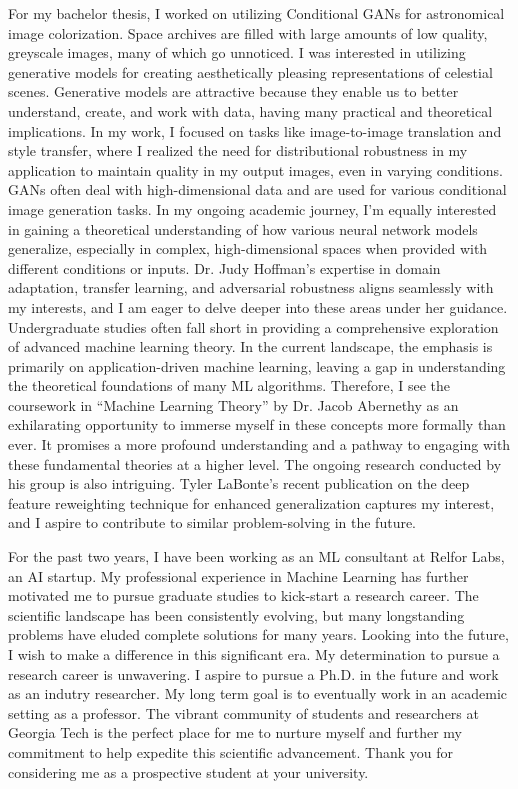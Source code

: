 \documentclass{article}
\begin{document}
\vspace{5pt} 
\hspace{0.25in}For my bachelor thesis, I worked on utilizing Conditional GANs
for astronomical image colorization. Space archives are filled with large
amounts of low quality, greyscale images, many of which go unnoticed. I was
interested in utilizing generative models for creating aesthetically pleasing
representations of celestial scenes. Generative models are attractive because
they enable us to better understand, create, and work with data, having many
practical and theoretical implications. In my work, I focused on tasks like
image-to-image translation and style transfer, where I realized the need for
distributional robustness in my application to maintain quality in my output
images, even in varying conditions. GANs often deal with high-dimensional data
and are used for various conditional image generation tasks. In my ongoing
academic journey, I’m equally interested in gaining a theoretical understanding
of how various neural network models generalize, especially in complex,
high-dimensional spaces when provided with different conditions or inputs. Dr.
Judy Hoffman's expertise in domain adaptation, transfer learning, and
adversarial robustness aligns seamlessly with my interests, and I am eager to
delve deeper into these areas under her guidance. Undergraduate studies often
fall short in providing a comprehensive exploration of advanced machine learning
theory. In the current landscape, the emphasis is primarily on
application-driven machine learning, leaving a gap in understanding the
theoretical foundations of many ML algorithms. Therefore, I see the coursework
in “Machine Learning Theory” by Dr. Jacob Abernethy as an exhilarating
opportunity to immerse myself in these concepts more formally than ever. It
promises a more profound understanding and a pathway to engaging with these
fundamental theories at a higher level. The ongoing research conducted by his
group is also intriguing. Tyler LaBonte's recent publication on the deep feature
reweighting technique for enhanced generalization captures my interest, and I
aspire to contribute to similar problem-solving in the future.

\vspace{5pt} 
\hspace{0.25in}For the past two years, I have been working as an ML
consultant at Relfor Labs, an AI startup. My professional experience in Machine
Learning has further motivated me to pursue graduate studies to kick-start a
research career. The scientific landscape has been consistently evolving, but
many longstanding problems have eluded complete solutions for many years.
Looking into the future, I wish to make a difference in this significant era. My
determination to pursue a research career is unwavering. I aspire to pursue a
Ph.D. in the future and work as an indutry researcher. My long term goal is to 
eventually work in an academic setting as a professor. The vibrant community of
students and researchers at Georgia Tech is the perfect place for me to nurture
myself and further my commitment to help expedite this scientific advancement.
Thank you for considering me as a prospective student at your university.
\end{document}

